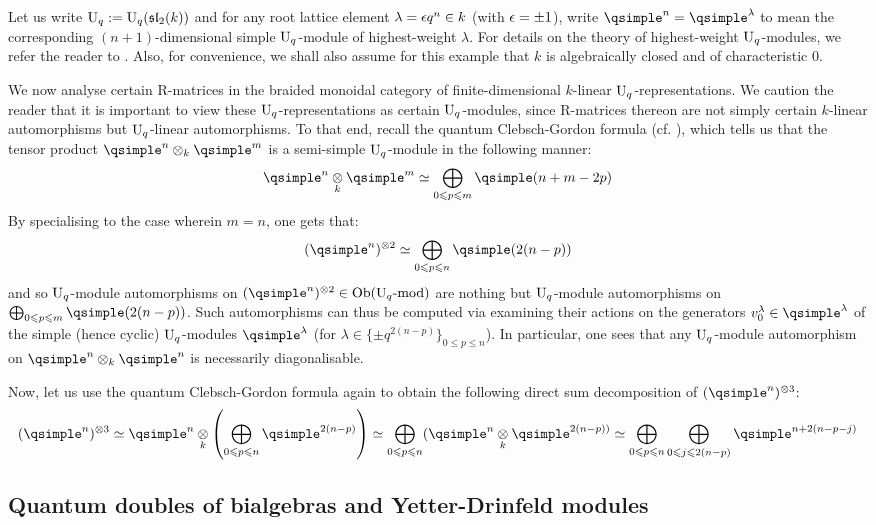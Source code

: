         \begin{example}
            Let us write $\mathrm{U}_q := \mathrm{U}_q(\mathfrak{sl}_2(k))$ and for any root lattice element $\lambda = \epsilon q^n\in k$ (with $\epsilon = \pm 1$), write $\qsimple^n = \qsimple^{\lambda}$ to mean the corresponding $(n + 1)$-dimensional simple $\mathrm{U}_q$-module of highest-weight $\lambda$. For details on the theory of highest-weight $\mathrm{U}_q$-modules, we refer the reader to \cite[Chapters VI and VII]{kassel_quantum_groups}. Also, for convenience, we shall also assume for this example that $k$ is algebraically closed and of characteristic $0$. 
            
            We now analyse certain R-matrices in the braided monoidal category of finite-dimensional $k$-linear $\mathrm{U}_q$-representations. We caution the reader that it is important to view these $\mathrm{U}_q$-representations as certain $\mathrm{U}_q$-modules, since R-matrices thereon are not simply certain $k$-linear automorphisms but $\mathrm{U}_q$-linear automorphisms. To that end, recall the quantum Clebsch-Gordon formula (cf. \cite[Theorem VII.7.1]{kassel_quantum_groups}), which tells us that the tensor product $\qsimple^n \tensor_k \qsimple^m$ is a semi-simple $\mathrm{U}_q$-module in the following manner:
                $$\qsimple^n \tensor_k \qsimple^m \cong \bigoplus_{0 \leq p \leq m} \qsimple(n + m - 2p)$$
            By specialising to the case wherein $m = n$, one gets that:
                $$(\qsimple^n)^{\tensor 2} \cong \bigoplus_{0 \leq p \leq n} \qsimple(2(n - p))$$
            and so $\mathrm{U}_q$-module automorphisms on $(\qsimple^n)^{\tensor 2} \in \Ob(\rmU_q\mod)$ are nothing but $\mathrm{U}_q$-module automorphisms on $\bigoplus_{0 \leq p \leq m} \qsimple(2(n - p))$. Such automorphisms can thus be computed via examining their actions on the generators $v^{\lambda}_0 \in \qsimple^{\lambda}$ of the simple (hence cyclic) $\mathrm{U}_q$-modules $\qsimple^{\lambda}$ (for $\lambda \in \{\pm q^{ 2(n - p) }\}_{0 \leq p \leq n}$). In particular, one sees that any $\mathrm{U}_q$-module automorphism on $\qsimple^n \tensor_k \qsimple^n$ is necessarily diagonalisable. 
            
            Now, let us use the quantum Clebsch-Gordon formula again to obtain the following direct sum decomposition of $(\qsimple^n)^{\tensor 3}$:
                $$(\qsimple^n)^{\tensor 3} \cong \qsimple^n \tensor_k \left( \bigoplus_{0 \leq p \leq n} \qsimple^{2(n - p)} \right) \cong \bigoplus_{0 \leq p \leq n} ( \qsimple^n \tensor_k \qsimple^{2(n - p))} \cong \bigoplus_{0 \leq p \leq n} \bigoplus_{0 \leq j \leq 2(n - p)} \qsimple^{n + 2(n - p - j)}$$
        \end{example}
    
    \subsection{Quantum doubles of bialgebras and Yetter-Drinfeld modules}